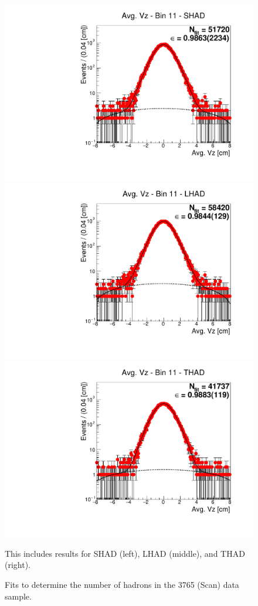 \begin{figure}[H]
\centering
\includegraphics[scale=0.25]{figures/plots/nonDDbar_fit_results/scan/fit_scan_11_data_SHAD.pdf}
\hspace{-0.5cm}
\includegraphics[scale=0.25]{figures/plots/nonDDbar_fit_results/scan/fit_scan_11_data_LHAD.pdf}
\hspace{-0.5cm}
\includegraphics[scale=0.25]{figures/plots/nonDDbar_fit_results/scan/fit_scan_11_data_THAD.pdf}
\caption{Fits to determine the number of hadrons in the 3765 (Scan) data sample.}
{This includes results for SHAD (left), LHAD (middle), and THAD (right).}
\label{fig:hadron_fits_scan_11}
\end{figure}

